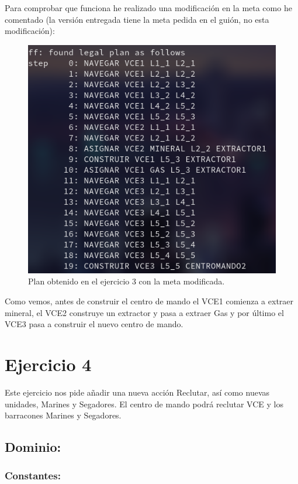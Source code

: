 \documentclass[10pt, spanish]{article}
\begin{document}
Para comprobar que funciona he realizado una modificación en la meta como he comentado (la versión entregada tiene la meta pedida en el guión, no esta modificación):


\begin{figure}[H]
	\centering
	\includegraphics[scale=0.4]{plan3C.png}
	\caption{Plan obtenido en el ejercicio 3 con la meta modificada.}
	\label{plan3C}
\end{figure}

Como vemos, antes de construir el centro de mando el VCE1 comienza a extraer mineral, el VCE2 construye un extractor y pasa a extraer Gas y por último el VCE3 pasa a construir el nuevo centro de mando.

\section{Ejercicio 4}

Este ejercicio nos pide añadir una nueva acción Reclutar, así como nuevas unidades, Marines y Segadores. El centro de mando podrá reclutar VCE y los barracones Marines y Segadores.

\subsection{Dominio:}

\subsubsection{Constantes:}
\end{document}
